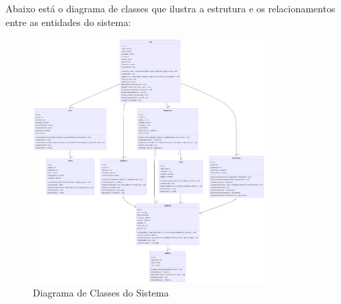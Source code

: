 Abaixo está o diagrama de classes que ilustra a estrutura e os relacionamentos entre as entidades do sistema:

\begin{figure}[h]
\centering
\includegraphics[width=0.8\textwidth]{figuras/diagrama-classes.png}
\caption{Diagrama de Classes do Sistema}
\label{fig:diagrama-classes}
\end{figure}

